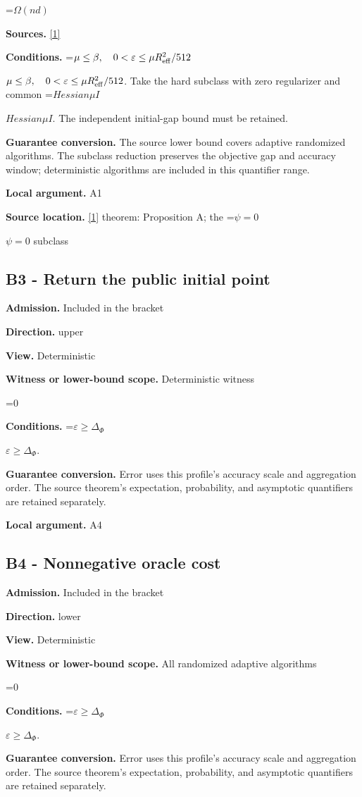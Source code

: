 \documentclass[10pt,a4paper]{article}
\newcommand{\AtlasMath}[1]{\par\begingroup\centering\setbox0=\hbox{$\displaystyle #1$}\ifdim\wd0>1.4\linewidth\typeout{ATLAS WIDE FORMULA: \the\wd0}\fi\ifdim\wd0>\linewidth\resizebox{\linewidth}{!}{\box0}\else\box0\fi\par\endgroup}
\newcommand{\AtlasInlineMath}[1]{\begingroup\setbox0=\hbox{$#1$}\ifdim\wd0>.4\linewidth\endgroup\AtlasMath{#1}\else\endgroup$#1$\fi}
\begin{document}
\AtlasMath{\Omega(nd)}
\textbf{Sources.} \href{https://arxiv.org/html/2610.00345v1}{[1]}

\textbf{Conditions.} \AtlasInlineMath{\mu\le\beta,\quad0<\varepsilon\le\mu R_{\rm eff}^2/512}. Take the hard subclass with zero regularizer and common \AtlasInlineMath{Hessian \mu I}. The independent initial-gap bound must be retained.

\textbf{Guarantee conversion.} The source lower bound covers adaptive randomized algorithms. The subclass reduction preserves the objective gap and accuracy window; deterministic algorithms are included in this quantifier range.

\textbf{Local argument.} A1

\textbf{Source location.} \href{https://arxiv.org/html/2610.00345v1}{[1]} theorem: Proposition A; the \AtlasInlineMath{\psi=0} subclass

\subsection{B3 - Return the public initial point}
\textbf{Admission.} Included in the bracket

\textbf{Direction.} upper

\textbf{View.} Deterministic

\textbf{Witness or lower-bound scope.} Deterministic witness

\AtlasMath{0}
\textbf{Conditions.} \AtlasInlineMath{\varepsilon\ge\Delta_\Phi}.

\textbf{Guarantee conversion.} Error uses this profile's accuracy scale and aggregation order. The source theorem's expectation, probability, and asymptotic quantifiers are retained separately.

\textbf{Local argument.} A4

\subsection{B4 - Nonnegative oracle cost}
\textbf{Admission.} Included in the bracket

\textbf{Direction.} lower

\textbf{View.} Deterministic

\textbf{Witness or lower-bound scope.} All randomized adaptive algorithms

\AtlasMath{0}
\textbf{Conditions.} \AtlasInlineMath{\varepsilon\ge\Delta_\Phi}.

\textbf{Guarantee conversion.} Error uses this profile's accuracy scale and aggregation order. The source theorem's expectation, probability, and asymptotic quantifiers are retained separately.
\end{document}
